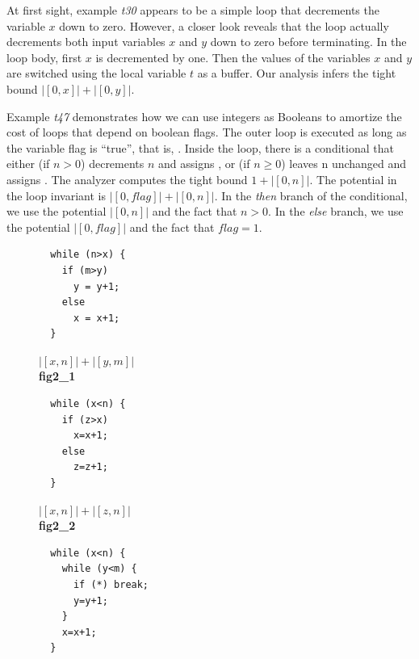 \documentclass[nocopyrightspace,preprint,pldi]{sigplanconf-pldi15}
\begin{document}
{At first sight, example \emph{t30} appears to be a simple loop that
decrements the variable $x$ down to zero.  However, a closer look
reveals that the loop actually decrements both input variables $x$ and
$y$ down to zero before terminating.  In the loop body, first $x$ is
decremented by one.  Then the values of the variables $x$ and $y$ are
switched using the local variable $t$ as a buffer.  Our analysis
infers the tight bound $|[0,x]|+|[0,y]|$.

Example \emph{t47} demonstrates how we can use integers as Booleans to
amortize the cost of loops that depend on boolean flags.  The outer
loop is executed as long as the variable flag is ``true'', that is,
.  Inside the loop, there is a conditional that either
(if $n>0$) decrements $n$ and assigns , or (if $n\geq0$)
leaves n unchanged and assigns .  The analyzer computes
the tight bound $1 + |[0, n]|$.  The potential in the loop invariant
is $|[0,\mathit{flag}]| + |[0, n]|$.  In the \emph{then} branch of
the conditional, we use the potential $|[0, n]|$ and the fact that
$n>0$.  In the \emph{else} branch, we use the potential
$|[0,\mathit{flag}]|$ and the fact that $\mathit{flag}=1$.




\begin{figure}
 \setlength{\progwidth}{.24\linewidth}
  \centering
  \begin{minipage}[b]{\progwidth}
    \begin{center}
   \begin{lstlisting}
  while (n>x) {
    if (m>y)
      y = y+1;
    else
      x = x+1;
  }
   \end{lstlisting}

$|[x, n]| + |[y, m]|$
\\[.7\baselineskip]
      {\bf fig2\_1}
    \end{center}
  \end{minipage}
%
%
  \begin{minipage}[b]{\progwidth}
    \begin{center}
   \begin{lstlisting}
  while (x<n) {
    if (z>x)
      x=x+1;
    else
      z=z+1;
  }
   \end{lstlisting}

$|[x, n]| + |[z, n]|$
\\[.7\baselineskip]
      {\bf fig2\_2}
    \end{center}
  \end{minipage}
%
%
  \begin{minipage}[b]{\progwidth}
    \begin{center}
   \begin{lstlisting}
  while (x<n) {
    while (y<m) {
      if (*) break;
      y=y+1;
    }
    x=x+1;
  }
   \end{lstlisting}


\end{center}
\end{minipage}
\end{figure}}
\end{document}
